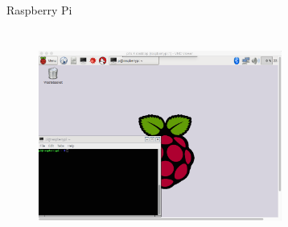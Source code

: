\begin{frame}[plain]{Raspberry Pi}
\begin{figure}
\includegraphics[width=8cm, height=7cm]{vnc.png}
\end{figure}	
\end{frame}